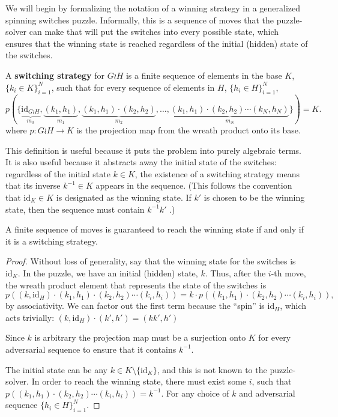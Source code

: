 We will begin by formalizing the notation of a winning strategy in a
generalized spinning switches puzzle. Informally, this is
a sequence of moves that the puzzle-solver can make that will put the switches
into every possible state, which ensures that the winning state is reached
regardless of the initial (hidden) state of the switches.

\begin{definition}
  A \textbf{switching strategy} for $G \wr H$ is a finite sequence of elements
  in the base $K$,
  $\{k_i \in K\}_{i=1}^N$,
  such that for every sequence of elements in $H$, ${\{h_i \in H\}_{i=1}^N}$,
  \begin{equation}
    p(\{
      \underbrace{\mathrm{id}_{G \wr H}}_{m_0},
      \underbrace{(k_1, h_1)}_{m_1},
      \underbrace{(k_1, h_1)\cdot(k_2, h_2)}_{m_2},
      \dots,
      \underbrace{(k_1, h_1)\cdot(k_2, h_2)\cdots(k_N, h_N)}_{m_N}
    \}) = K.
  \end{equation}
  where $p \colon G \wr H \rightarrow K$ is the projection map from the
  wreath product onto its base.
\label{def:switchingStrategy}
\end{definition}

This definition is useful because it puts the problem into purely algebraic
terms. It is also useful because it abstracts away the initial state of the
switches: regardless of the initial state $k \in K$, the existence of a
switching strategy means that its inverse $k^{-1} \in K$ appears in the sequence.
(This follows the convention that $\mathrm{id}_K \in K$ is designated as the
winning state. If $k'$ is chosen to be the winning state, then the sequence
must contain $k^{-1}k'$ .)

\begin{proposition}
  A finite sequence of moves is guaranteed to reach the winning
  state if and only if it is a switching strategy.
\end{proposition}
\begin{proof}
  Without loss of generality, say that the winning state for the switches is
  $\mathrm{id}_K$.
  In the puzzle, we have an initial (hidden) state, $k$.
  Thus, after the $i$-th move, the wreath product
  element that represents the state of the switches is \begin{equation}
    p\left((k, \mathrm{id}_H)\cdot(k_1, h_1)\cdot(k_2, h_2)\cdots(k_i, h_i)\right)
    = k \cdot p\left((k_1, h_1)\cdot(k_2, h_2)\cdots(k_i, h_i)\right),
  \end{equation} by associativity. We can factor out the first term because
  the ``spin'' is $\mathrm{id}_H$, which acts trivially:
  ${(k, \mathrm{id}_H) \cdot (k', h') = (kk', h')}$

  Since $k$ is arbitrary the projection map must be a surjection onto $K$ for
  every adversarial sequence to ensure that it contains $k^{-1}$.

  The initial state can be any $k \in K \setminus \{\mathrm{id}_K\}$,
  and this is not known to the puzzle-solver.
  In order to reach the winning state, there must exist some $i$, such that
  $p\left((k_1, h_1)\cdot(k_2, h_2)\cdots(k_i, h_i)\right) = k^{-1}$.
  For any choice of $k$ and adversarial sequence $\{h_i \in H\}_{i=1}^N$.
\end{proof}

